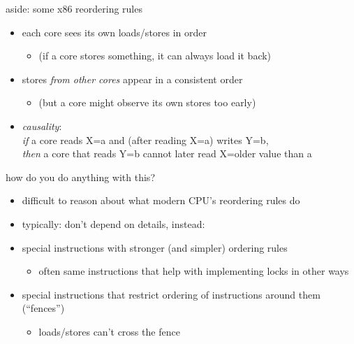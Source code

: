 
\begin{frame}{aside: some x86 reordering rules}
\begin{itemize}
\item each core sees its own loads/stores in order
    \begin{itemize}
    \item (if a core stores something, it can always load it back)
    \end{itemize}
\item stores \textit{from other cores} appear in a consistent order
    \begin{itemize}
    \item (but a core might observe its own stores too early)
    \end{itemize}
\item \textit{causality}: \\
    \textit{if} a core reads X=a and (after reading X=a) writes Y=b, \\
    \textit{then} a core that reads Y=b cannot later read X=older value than a
\end{itemize}
\end{frame}

\begin{frame}{how do you do anything with this?}
    \begin{itemize}
    \item difficult to reason about what modern CPU's reordering rules do
    \item typically: don't depend on details, instead:
    \vspace{.5cm}
    \item special instructions with stronger (and simpler) ordering rules
        \begin{itemize}
        \item often same instructions that help with implementing locks in other ways
        \end{itemize}
    \item special instructions that restrict ordering of instructions around them (``fences'')
        \begin{itemize}
        \item loads/stores can't cross the fence
        \end{itemize}
    \end{itemize}
\end{frame}
